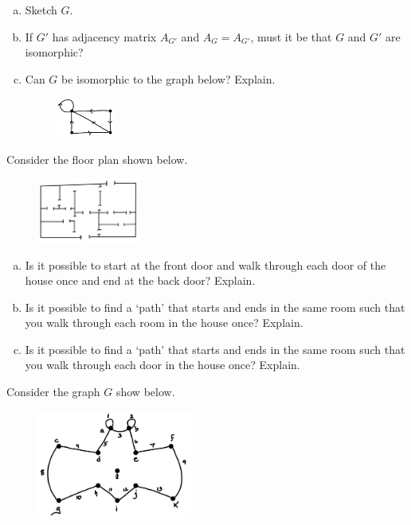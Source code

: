 \documentclass[12pt,letterpaper]{exam}
\begin{document}
\begin{questions}
\begin{enumerate}[(a)]
\item Sketch $G$. 
\item If $G'$ has adjacency matrix $A_{G'}$ and $A_G= A_{G'}$, must it be that $G$ and $G'$ are isomorphic? 
\item Can $G$ be isomorphic to the graph below? Explain. 
	\begin{figure}[h]
	\centering
	\includegraphics[width=0.18\textwidth]{graph2.jpg}
	\end{figure}
\end{enumerate}



\newpage



\newpage
\question[10] Consider the floor plan shown below.
	\begin{figure}[h]
	\centering
	\includegraphics[width=0.3\textwidth]{graph3.jpg}
	\end{figure}

\begin{enumerate}[(a)]
\item Is it possible to start at the front door and walk through each door of the house once and end at the back door? Explain. 
\item Is it possible to find a `path' that starts and ends in the same room such that you walk through each room in the house once? Explain. 
\item Is it possible to find a `path' that starts and ends in the same room such that you walk through each door in the house once? Explain. 
\end{enumerate}



\newpage



\newpage
\question[10] Consider the graph $G$ show below.
	\begin{figure}[h]
	\centering
	\includegraphics[width=0.45\textwidth]{graph4.jpg}
	\end{figure}


\end{questions}
\end{document}
